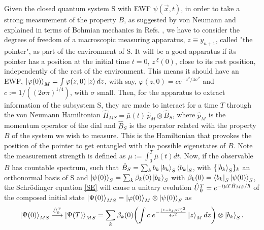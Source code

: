 \documentclass[11pt, a4paper]{article} %
\begin{document}
Given the closed quantum system S with EWF $\psi(\vec{x},t)$, in order to take a strong measurement of the property $B$, as suggested by von Neumann \cite{vonNeumann} and explained in terms of Bohmian mechanics in Refs. \cite{Durr, JordiXavier, Holland}, we have to consider the degrees of freedom of a macroscopic measuring apparatus, $z\equiv y_{n+1}$, called "the pointer", as part of the environment of S. It will be a good apparatus if its pointer has a position at the initial time $t=0$, $z^{\;\xi}(0)$, close to its rest position, independently of the rest of the environment. This means it should have an EWF, $\ket{\varphi(0)}_M=\int\varphi(z,0) \ket{z}dz$, with say, $\varphi(z,0)=c e^{-z^2/4\sigma^2}$ and $c:=1/((2\sigma\pi)^{1/4})$, with $\sigma$ small. Then, for the apparatus to extract information of the subsystem S, they are made to interact for a time $T$ through the von Neumann Hamiltonian $\hat{H}_{MS}=\bar{\mu}(t)\,\hat{p}_M\otimes \hat{B}_S$, where $\hat{p}_M$ is the momentum operator of the dial and $\hat{B}_S$ is the operator related with the property $B$ of the system we wish to measure. This is the Hamiltonian that provokes the position of the pointer to get entangled with the possible eigenstates of $B$. Note the measurement strength is defined as $\mu:=\int_0^T\bar{\mu}(t)dt$. Now, if the observable $B$ has countable spectrum, such that $\hat{B}_S=\sum_k b_k \ket{b_k}_S\bra{b_k}_S$, with $\{\ket{b_k}_S\}_k$ an orthonormal basis of S and $\ket{\psi(0)}_S=\sum_k \beta_k(0)\ket{b_k}_S$ with $\beta_k(0)=\bra{b_k}_S\ket{\psi(0)}_S$, the Schrödinger equation \eqref{SE} will cause a unitary evolution $\hat{U} \null_{0}^T=e^{-i\mu T \hat{H}_{MS}/\hbar}$ of the composed initial state $\ket{\Psi(0)}_{MS}=\ket{\varphi(0)}_M\otimes\ket{\psi(0)}_S$ as\vspace{-0.15cm}
\begin{equation}\label{postM1}
\ket{\Psi(0)}_{MS} \overset{\hat{U}_{0}^T}{\longrightarrow} \ket{\Psi(T)}_{MS}=\sum_k \beta_k(0)\qty(\int c \; e^{-\frac{(z-b_k\mu T)^2}{4\sigma^2}}\ket{z}_M dz )\otimes \ket{b_k}_S. \vspace{-0.15cm}
\end{equation}
\end{document}
